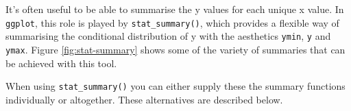 It's often useful to be able to summarise the y values for each unique x
value. In \texttt{ggplot}, this role is played by
\texttt{stat\_summary()}, which provides a flexible way of summarising
the conditional distribution of y with the aesthetics \texttt{ymin},
\texttt{y} and \texttt{ymax}. Figure \ref{fig:stat-summary} shows some
of the variety of summaries that can be achieved with this tool.
  

When using \texttt{stat\_summary()} you can either supply these the
summary functions individually or altogether. These alternatives are
described below.

\begin{Shaded}
\begin{Highlighting}[]
\StringTok{ }
\StringTok{ }\NormalTok{(} \NormalTok{, } \NormalTok{)}
\StringTok{ }\NormalTok{(} \NormalTok{, } \NormalTok{)}
\StringTok{ }\NormalTok{(} \NormalTok{, } \NormalTok{)}
\StringTok{ }\NormalTok{(} \NormalTok{, } \NormalTok{)}
\StringTok{ }\NormalTok{(}
\StringTok{ }\NormalTok{(} \NormalTok{, } \NormalTok{)}
\StringTok{ }\NormalTok{(} \NormalTok{, } \NormalTok{)}
\StringTok{ }\NormalTok{(} \NormalTok{, } \NormalTok{)}
\StringTok{ }\NormalTok{(} \NormalTok{, } \NormalTok{)}
\end{Highlighting}
\end{Shaded}

